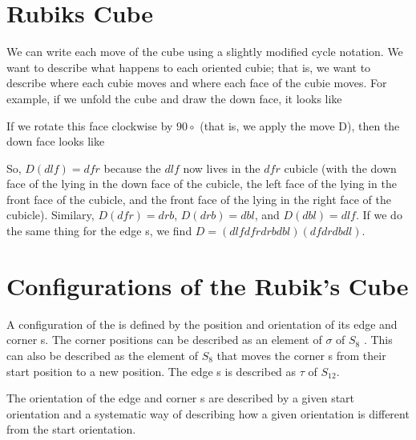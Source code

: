 \section{Rubiks Cube}

We can write each move of the \rubik{} cube using a slightly modified cycle notation. We want to describe
what happens to each oriented cubie; that is, we want to describe where each cubie moves and where each
face of the cubie moves. For example, if we unfold the cube and draw the down face, it looks like

If we rotate this face clockwise by $90\circ$ (that is, we apply the move D), then the down face looks like

So, $D(dlf) = dfr$ because the $dlf$ \cpiece{} now lives in the $dfr$ cubicle (with the down face of the \cpiece{} lying in the down
face of the cubicle, the left face of the \cpiece{} lying in the front face of the cubicle, and the front face of the \cpiece{} lying
in the right face of the cubicle). Similary, $D(dfr) = drb$, $D(drb) = dbl$, and $D(dbl) = dlf$. If we do the same thing
for the edge \cpiece{}s, we find $D = (dlf dfr drb dbl)(df dr db dl)$.

\section{Configurations of the Rubik's Cube}

A configuration of the \rubik{} is defined by the position and orientation of its edge and corner \cpiece{}s. The corner \cpiece{} positions can be described as an element of $\sigma$ of $S_8$ . This can also be described as the element of $S_8$ that moves the corner \cpiece{}s from their start position to a new position. The edge \cpiece{}s is described as $\tau$ of $S_12$. 

The orientation of the edge and corner \cpiece{}s are described by a given start orientation and a systematic way of describing how a given orientation is different from the start orientation. 

\myTail{
}
%